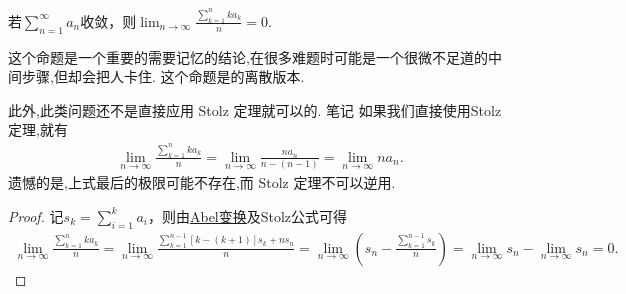 \documentclass[../../main.tex]{subfiles}%
\begin{document}
\begin{proposition}\label{proposition:级数收敛平均级数必收敛}
若$\sum_{n=1}^{\infty}a_n$收敛，则$\lim_{n\rightarrow \infty}\frac{\sum\limits_{k=1}^n{ka_k}}{n}=0$.
\end{proposition}
\begin{remark}
这个命题是一个重要的需要记忆的结论,在很多难题时可能是一个很微不足道的中间步骤,但却会把人卡住.
这个命题是的离散版本.
\end{remark}
\begin{note}
此外,此类问题还不是直接应用 Stolz 定理就可以的.
笔记 如果我们直接使用Stolz 定理,就有
\begin{align*}
\lim_{n \to \infty} \frac{\sum\limits_{k=1}^n k a_k}{n} = \lim_{n \to \infty} \frac{n a_n}{n - (n - 1)} = \lim_{n \to \infty} n a_n.
\end{align*}
遗憾的是,上式最后的极限可能不存在,而 Stolz 定理不可以逆用.
\end{note}
\begin{proof}

记$s_k=\sum_{i=1}^k{a_i}$，则由\hyperref[theorem:Abel变换]{Abel变换}及Stolz公式可得
\begin{align*}
\lim_{n\rightarrow \infty}\frac{\sum\limits_{k=1}^n{ka_k}}{n}=\lim_{n\rightarrow \infty}\frac{\sum\limits_{k=1}^{n-1}\left[ k-\left( k+1 \right) \right] s_k+ns_n}{n}
=\lim_{n\rightarrow \infty}\left( s_n-\frac{\sum\limits_{k=1}^{n-1}s_k}{n} \right)
=\lim_{n\rightarrow \infty}s_n-\lim_{n\rightarrow \infty}s_n=0.
\end{align*}

\end{proof}
\end{document}

